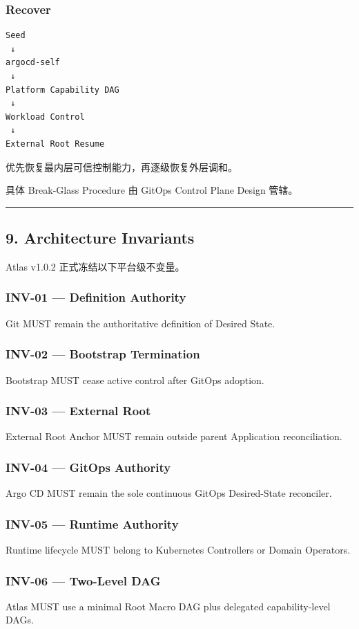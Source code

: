 \documentclass[11pt,a4paper]{article}
\begin{document}
\subsubsection{Recover}
\begin{lstlisting}[language=text]
Seed
 ↓
argocd-self
 ↓
Platform Capability DAG
 ↓
Workload Control
 ↓
External Root Resume
\end{lstlisting}
优先恢复最内层可信控制能力，再逐级恢复外层调和。

具体 Break-Glass Procedure 由 GitOps Control Plane Design 管辖。

\vspace{0.5em}\hrule\vspace{0.5em}
\subsection{9. Architecture Invariants}
Atlas v1.0.2 正式冻结以下平台级不变量。

\subsubsection{INV-01 — Definition Authority}
Git MUST remain the authoritative definition of Desired State.

\subsubsection{INV-02 — Bootstrap Termination}
Bootstrap MUST cease active control after GitOps adoption.

\subsubsection{INV-03 — External Root}
External Root Anchor MUST remain outside parent Application reconciliation.

\subsubsection{INV-04 — GitOps Authority}
Argo CD MUST remain the sole continuous GitOps Desired-State reconciler.

\subsubsection{INV-05 — Runtime Authority}
Runtime lifecycle MUST belong to Kubernetes Controllers or Domain Operators.

\subsubsection{INV-06 — Two-Level DAG}
Atlas MUST use a minimal Root Macro DAG plus delegated capability-level DAGs.
\end{document}
